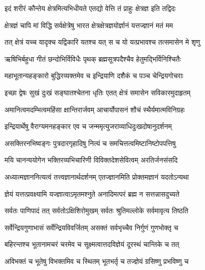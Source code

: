 
\twolineshloka
{इदं शरीरं कौन्तेय क्षेत्रमित्यभिधीयते}
{एतद्यो वेत्ति तं प्राहुः क्षेत्रज्ञ इति तद्विदः}%

\twolineshloka
{क्षेत्रज्ञं चापि मां विद्धि सर्वक्षेत्रेषु भारत}
{क्षेत्रक्षेत्रज्ञयोर्ज्ञानं यत्तज्ज्ञानं मतं मम}%

\twolineshloka
{तत् क्षेत्रं यच्च यादृक्च यद्विकारि यतश्च यत्}
{स च यो यत्प्रभावश्च तत्समासेन मे शृणु}%

\twolineshloka
{ऋषिभिर्बहुधा गीतं छन्दोभिर्विविधैः पृथक्}
{ब्रह्मसूत्रपदैश्चैव हेतुमद्भिर्विनिश्चितैः}%

\twolineshloka
{महाभूतान्यहङ्कारो बुद्धिरव्यक्तमेव च}
{इन्द्रियाणि दशैकं च पञ्च चेन्द्रियगोचराः}%

\twolineshloka
{इच्छा द्वेषः सुखं दुःखं सङ्घातश्चेतना धृतिः}
{एतत् क्षेत्रं समासेन सविकारमुदाहृतम्}%

\twolineshloka
{अमानित्वमदम्भित्वमहिंसा क्षान्तिरार्जवम्}
{आचार्योपासनं शौचं स्थैर्यमात्मविनिग्रहः}%

\twolineshloka
{इन्द्रियार्थेषु वैराग्यमनहङ्कार एव च}
{जन्ममृत्युजराव्याधिदुःखदोषानुदर्शनम्}%

\twolineshloka
{असक्तिरनभिष्वङ्गः पुत्रदारगृहादिषु}
{नित्यं च समचित्तत्वमिष्टानिष्टोपपत्तिषु}%

\twolineshloka
{मयि चानन्ययोगेन भक्तिरव्यभिचारिणी}
{विविक्तदेशसेवित्वम् अरतिर्जनसंसदि}%

\twolineshloka
{अध्यात्मज्ञाननित्यत्वं तत्त्वज्ञानार्थदर्शनम्}
{एतज्ज्ञानमिति प्रोक्तमज्ञानं यदतोऽन्यथा}%

\twolineshloka
{ज्ञेयं यत्तत्प्रवक्ष्यामि यज्ज्ञात्वाऽमृतमश्नुते}
{अनादिमत्परं ब्रह्म न सत्तन्नासदुच्यते}%

\twolineshloka
{सर्वतः पाणिपादं तत् सर्वतोऽक्षिशिरोमुखम्}
{सर्वतः श्रुतिमल्लोके सर्वमावृत्य तिष्ठति}%

\twolineshloka
{सर्वेन्द्रियगुणाभासं सर्वेन्द्रियविवर्जितम्}
{असक्तं सर्वभृच्चैव निर्गुणं गुणभोक्तृ च}%

\twolineshloka
{बहिरन्तश्च भूतानामचरं चरमेव च}
{सूक्ष्मत्वात्तदविज्ञेयं दूरस्थं चान्तिके च तत्}%

\twolineshloka
{अविभक्तं च भूतेषु विभक्तमिव च स्थितम्}
{भूतभर्तृ च तज्ज्ञेयं ग्रसिष्णु प्रभविष्णु च}%

